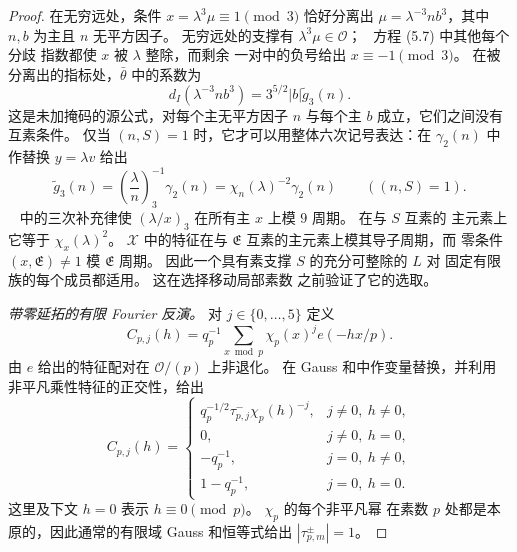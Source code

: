 \documentclass[11pt,a4paper]{article}
\numberwithin{equation}{section}
\numberwithin{figure}{section}
\theoremstyle{definition}
\theoremstyle{remark}
\begin{document}
\begin{proof}
在无穷远处，条件 $x=\lambda^3\mu\equiv1\pmod3$ 恰好分离出
$\mu=\lambda^{-3}nb^3$，其中 $n,b$ 为主且 $n$ 无平方因子。
无穷远处的支撑有 $\lambda^3\mu\in\mathcal O$；~\cite{DR}
方程 (5.7) 中其他每个分歧
指数都使 $x$ 被 $\lambda$ 整除，而剩余
一对中的负号给出 $x\equiv-1\pmod3$。 在被分离出的指标处，$\bar\theta$
中的系数为
\begin{equation}\label{eq:reflection-infinity-coefficient}
 d_I(\lambda^{-3}nb^3)=3^{5/2}|b|\widetilde g_3(n).
\end{equation}
这是未加掩码的源公式，对每个主无平方因子 $n$
与每个主 $b$ 成立，它们之间没有互素条件。 仅当
$(n,S)=1$ 时，它才可以用整体六次记号表达：在 $\gamma_2(n)$ 中作替换
$y=\lambda v$ 给出
\begin{equation}\label{eq:reflection-cubic-sextic-conversion}
 \widetilde g_3(n)=\left(\frac\lambda n\right)_3^{-1}\gamma_2(n)
       =\chi_n(\lambda)^{-2}\gamma_2(n)\qquad((n,S)=1).
\end{equation}
~\cite[方程 (1.5)]{DR} 中的三次补充律使
$(\lambda/x)_3$ 在所有主 $x$ 上模 $9$ 周期。 在与 $S$ 互素的
主元素上它等于 $\chi_x(\lambda)^2$。 $\mathcal X$ 中的特征在与 $\mathfrak E$
互素的主元素上模其导子周期，而
零条件 $(x,\mathfrak E)\ne1$ 模 $\mathfrak E$ 周期。
因此一个具有素支撑 $S$ 的充分可整除的 $L$ 对
固定有限族的每个成员都适用。 这在选择移动局部素数
之前验证了它的选取。

\emph{带零延拓的有限 Fourier 反演。}
对 $j\in\{0,\ldots,5\}$ 定义
\[
 C_{p,j}(h)=q_p^{-1}\sum_{x\bmod p}\chi_p(x)^j e(-hx/p).
\]
由 $e$ 给出的特征配对在
$\mathcal O/(p)$ 上非退化。 在 Gauss 和中作变量替换，并利用
非平凡乘性特征的正交性，给出
\begin{equation}\label{eq:reflection-local-fourier}
 C_{p,j}(h)=\begin{cases}
 q_p^{-1/2}\tau_{p,j}^{-}\chi_p(h)^{-j},&j\ne0,\ h\ne0,\\
 0,&j\ne0,\ h=0,\\
 -q_p^{-1},&j=0,\ h\ne0,\\
 1-q_p^{-1},&j=0,\ h=0.
 \end{cases}
\end{equation}
这里及下文 $h=0$ 表示 $h\equiv0\pmod p$。 $\chi_p$ 的每个非平凡幂
在素数 $p$ 处都是本原的，因此通常的有限域
Gauss 和恒等式给出 $|\tau_{p,m}^{\pm}|=1$。


\end{proof}
\end{document}
